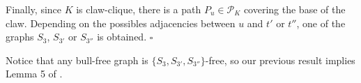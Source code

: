 \documentclass[9pt]{entcs}
\newcommand{\la}[1]{\textcolor{blue}{\sf{#1}}}%
\begin{document}
\begin{pf}
 Finally,   since $K$ is claw-clique,  there is a path $P_u \in \mathcal{P}_K$ covering the base of the claw. Depending on the 
 possibles adjacencies between  $u$ and $t'$ or  $t''$, one of the graphs  $S_{3}$, $S_{3'}$ or $S_{3''}$ is obtained.
%
% 
$\square$
\end{pf}




Notice that any bull-free graph is $\{S_{3}, S_{3'}, S_{3''}\}$-free, so our previous result implies  Lemma 5 of  \cite{ries2009}.


\end{document}
